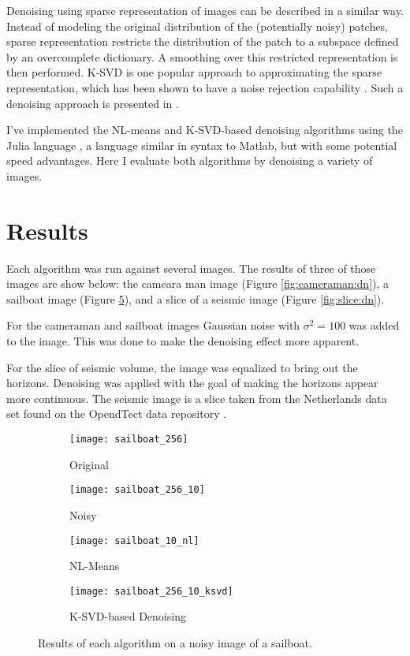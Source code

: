 \documentclass[11pt]{article}
\begin{document}
Denoising using sparse representation of images can be described in a similar way.
Instead of modeling the original distribution of the (potentially noisy) patches, sparse representation restricts the distribution of the patch to a subspace defined by an overcomplete dictionary.  
A smoothing over this restricted representation is then performed.
K-SVD \cite{aharon2005k} is one popular approach to approximating the sparse representation, which has been shown to have a noise rejection capability \cite{elad2006image}. 
Such a denoising approach is presented in \cite{elad2006image}.

I've implemented the NL-means and K-SVD-based denoising algorithms using the Julia language \cite{julia2012}, a language similar in syntax to Matlab, but with some potential speed advantages.
Here I evaluate both algorithms by denoising a variety of images.

\section{Results}

Each algorithm was run against several images.  
The results of three of those images are show below: the cameara man image (Figure \ref{fig:cameraman:dn}), a sailboat image (Figure \ref{fig:sailboat:dn}), and a slice of a seismic image (Figure \ref{fig:slice:dn}).

For the cameraman and sailboat images Gaussian noise with $\sigma^2=100$ was added to the image.
This was done to make the denoising effect more apparent.

For the slice of seismic volume, the image was equalized to bring out the horizons.
Denoising was applied with the goal of making the horizons appear more continuous.
The seismic image is a slice taken from the Netherlands data set found on the OpendTect data repository \cite{opendTectWeb}.

\begin{figure}
\centering
\graphicspath{{images/}}
\begin{subfigure}[b]{0.4\textwidth}
\centering
\texttt{[image: sailboat\_256]}
\caption{Original}
\label{sail:original}
\end{subfigure}
\begin{subfigure}[b]{0.4\textwidth}
\centering
\texttt{[image: sailboat\_256\_10]}
\caption{Noisy}
\label{sail:noise}
\end{subfigure}
\begin{subfigure}[b]{0.4\textwidth}
\centering
\texttt{[image: sailboat\_10\_nl]}
\caption{NL-Means}
\label{sail:nl}
\end{subfigure}
\begin{subfigure}[b]{0.4\textwidth}
\centering
\texttt{[image: sailboat\_256\_10\_ksvd]}
\caption{K-SVD-based Denoising}
\label{sail:ksvd}
\end{subfigure}
\caption{Results of each algorithm on a noisy image of a sailboat.}
\label{fig:sailboat:dn}
\end{figure}
\end{document}
